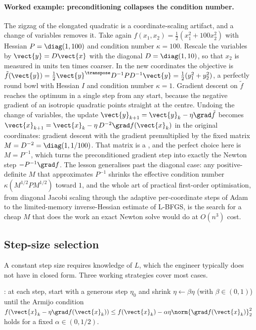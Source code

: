 \paragraph{Worked example: preconditioning collapses the condition
number.}
The zigzag of the elongated quadratic is a coordinate-scaling
artifact, and a change of variables removes it. Take again
$f(x_{1}, x_{2}) = \tfrac{1}{2}(x_{1}^{2} + 100 x_{2}^{2})$ with
Hessian $P = \diag(1, 100)$ and condition number $\kappa = 100$.
Rescale the variables by $\vect{y} = D \vect{x}$ with the diagonal
$D = \diag(1, 10)$, so that $x_{2}$ is measured in units ten times
coarser. In the new coordinates the objective is $\tilde{f}(\vect{y})
= \tfrac{1}{2} \vect{y}^{\transpose} D^{-1} P D^{-1} \vect{y} =
\tfrac{1}{2}(y_{1}^{2} + y_{2}^{2})$, a perfectly round bowl with
Hessian $I$ and condition number $\kappa = 1$. Gradient descent on
$\tilde{f}$ reaches the optimum in a single step from any start,
because the negative gradient of an isotropic quadratic points
straight at the centre. Undoing the change of variables, the update
$\vect{y}_{k+1} = \vect{y}_{k} - \eta \grad \tilde{f}$ becomes
$\vect{x}_{k+1} = \vect{x}_{k} - \eta \, D^{-2} \grad f(\vect{x}_{k})$
in the original coordinates: gradient descent with the gradient
premultiplied by the fixed matrix $M = D^{-2} = \diag(1, 1/100)$. That
matrix is a , and the perfect choice here is
$M = P^{-1}$, which turns the preconditioned gradient step into exactly
the Newton step $-P^{-1} \grad f$. The lesson generalises past the
diagonal case: any positive-definite $M$ that approximates $P^{-1}$
shrinks the effective condition number $\kappa(M^{1/2} P M^{1/2})$
toward $1$, and the whole art of practical first-order optimisation,
from diagonal Jacobi scaling through the adaptive per-coordinate steps
of Adam to the limited-memory inverse-Hessian estimate of L-BFGS, is
the search for a cheap $M$ that does the work an exact Newton solve
would do at $O(n^{3})$ cost.

\subsection{Step-size selection}

A constant step size requires knowledge of $L$, which the
engineer typically does not have in closed form. Three working
strategies cover most cases.

: at each step, start with a
generous step $\eta_{0}$ and shrink $\eta \leftarrow \beta \eta$
(with $\beta \in (0, 1)$) until the Armijo condition $f(\vect{x}_{k}
- \eta \grad f(\vect{x}_{k})) \leq f(\vect{x}_{k}) - \alpha \eta
\norm{\grad f(\vect{x}_{k})}_{2}^{2}$ holds for a fixed $\alpha
\in (0, 1/2)$.


